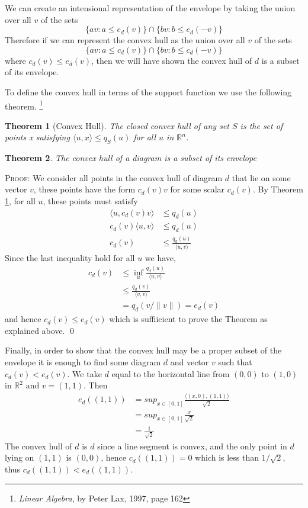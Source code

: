 \documentclass[11pt]{amsart}
\newtheorem{thm}{Theorem}
\begin{document}
We can create an intensional representation of the envelope by taking the union over all $v$ of the sets
$$\{av : a \leq e_d(v)\} \cap \{ bv : b \leq e_d(-v)\}$$
Therefore if we can represent the convex hull as the union over all $v$ of the sets
$$\{av : a \leq c_d(v)\} \cap \{ bv : b \leq c_d(-v)\}$$
where $c_d(v) \leq e_d(v)$, then we will have shown the convex hull of $d$ is a subset of its envelope.

To define the convex hull in terms of the support function we use the following theorem. 
\footnote{\emph{Linear Algebra}, by Peter Lax, 1997, page 162}

\begin{thm}[Convex Hull]
\label{convexhull} The closed convex hull of any set $S$ is the set of points x satisfying $\langle u, x \rangle \leq q_S(u)$ for all $u$ in $\mathbb{R}^n$.
\end{thm}

\begin{thm}
The convex hull of a diagram is a subset of its envelope
\end{thm}
\textsc{Proof}: We consider all points in the convex hull of diagram $d$ that lie on some vector $v$, these points have the form $c_d(v)v$ for some
scalar $c_d(v)$. By Theorem \ref{convexhull}, for all $u$, these points must satisfy
\begin{align}
\langle u, c_d(v)v \rangle &\leq q_d(u)\\
c_d(v)\langle u, v \rangle &\leq q_d(u)\\
c_d(v) &\leq  \frac{q_d(u)}{\langle u, v \rangle}
\end{align}
Since the last inequality hold for all $u$ we have,
\begin{align}
c_d(v) &\leq \inf_u  \frac{q_d(u)}{\langle u, v \rangle}\\
&\leq \frac{q_d(v)}{\langle v, v \rangle} \\
&= q_d(v/\|v\|)= e_d(v) 
\end{align}
 and hence $c_d(v) \leq e_d(v)$ which is suffiicient to prove the Theorem as explained above. \qed
 
 Finally, in order to show that the convex hull may be a proper subset of the envelope it is enough to find some diagram $d$ and vector $v$ such that
 $c_d(v) < e_d(v)$. We take $d$ equal to the horizontal line from $(0,0)$ to $(1,0)$ in $\mathbb{R}^2$ and $v=(1,1)$. Then
 \begin{align}
 e_d((1,1)) &= sup_{x \in [0,1]} \frac{\langle (x,0), (1,1) \rangle}{\sqrt{2}}\\
                 &= sup_{x \in [0,1]} \frac{x}{\sqrt{2}}\\
                 &= \frac{1}{\sqrt{2}}
\end{align}
The convex hull of $d$ is $d$ since a line segment is convex, and the only point in $d$ lying on $(1,1)$ is $(0,0)$, hence $c_d((1,1)) = 0$ which is less than 
$1/\sqrt{2}$, thus $c_d((1,1)) < e_d((1,1))$.
\end{document}
